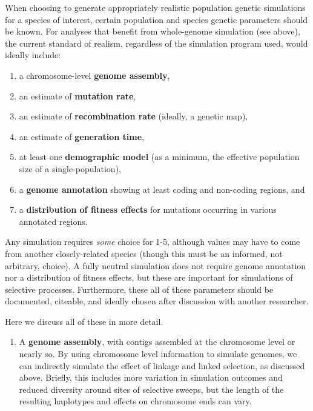 \documentclass[hidelinks]{article}
\providecommand{\tightlist}{%
\setlength{\itemsep}{0pt}\setlength{\parskip}{0pt}}
\begin{document}
When choosing to generate appropriately realistic population genetic
simulations for a species of interest, certain population and species
genetic parameters should be known. For analyses that benefit from
whole-genome simulation (see above), the current standard of realism,
regardless of the simulation program used, would ideally include:

\begin{enumerate}
\def\labelenumi{\arabic{enumi}.}
\tightlist
\item
  a chromosome-level \textbf{genome assembly},
\item
  an estimate of \textbf{mutation rate},
\item
  an estimate of \textbf{recombination rate} (ideally, a genetic map),
\item
  an estimate of \textbf{generation time},
\item
  at least one \textbf{demographic model} (as a minimum, the effective
  population size of a single-population),
\item
  a \textbf{genome annotation} showing at least coding and non-coding
  regions, and
\item
  a \textbf{distribution of fitness effects} for mutations occurring in
  various annotated regions.
\end{enumerate}

Any simulation requires \emph{some} choice for 1-5, although values may
have to come from another closely-related species (though this must be
an informed, not arbitrary, choice). A fully neutral simulation does not
require genome annotation nor a distribution of fitness effects, but
these are important for simulations of selective processes. Furthermore,
these all of these parameters should be documented, citeable, and
ideally chosen after discussion with another researcher.

Here we discuss all of these in more detail.

\begin{enumerate}
\def\labelenumi{\arabic{enumi}.}
\tightlist
\item
  A \textbf{genome assembly}, with contigs assembled at the chromosome
  level or nearly so. By using chromosome level information to simulate
  genomes, we can indirectly simulate the effect of linkage and linked
  selection, as discussed above. Briefly, this includes more variation
  in simulation outcomes and reduced diversity around sites of selective
  sweeps, but the length of the resulting haplotypes and effects on
  chromosome ends can vary.
\end{enumerate}
\end{document}
